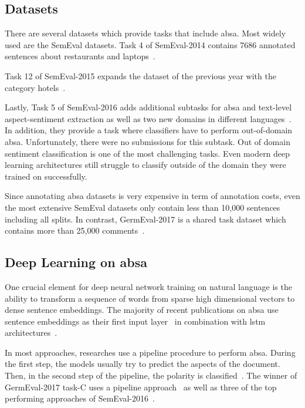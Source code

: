 \subsection{Datasets}

There are several datasets which provide tasks that include \gls{absa}. Most widely used are the SemEval datasets. Task 4 of SemEval-2014 contains 7686 annotated sentences about restaurants and laptops~\cite{Pontiki2014}. 

Task 12 of SemEval-2015 expands the dataset of the previous year with the category hotels~\cite{Pontiki2015a}. 

Lastly, Task 5 of SemEval-2016 adds additional subtasks for \gls{absa} and text-level aspect-sentiment extraction as well as two new domains in different languages~\cite{Pontiki2016}. In addition, they provide a task where classifiers have to perform out-of-domain \gls{absa}. Unfortunately, there were no submissions for this subtask. Out of domain sentiment classification is one of the most challenging tasks. Even modern deep learning architectures still struggle to classify outside of the domain they were trained on successfully.
\medskip

Since annotating \gls{absa} datasets is very expensive in term of annotation costs, even the most extensive SemEval datasets only contain less than 10,000 sentences including all splits. In contrast, GermEval-2017 is a shared task dataset which contains more than 25,000 comments~\cite{Wojatzki2017}.  

\subsection{Deep Learning on \gls{absa}}

One crucial element for deep neural network training on natural language is the ability to transform a sequence of words from sparse high dimensional vectors to dense sentence embeddings. The majority of recent publications on \gls{absa} use sentence embeddings as their first input layer~\cite{Ruder2016, Tang2016, Lee2017, Schmitt2018, Ma2018, Xue2018} in combination with \gls{lstm} architectures~\cite{Ruder2016, Tang2016, Ma2018}.
\medskip

In most approaches, researches use a pipeline procedure to perform \gls{absa}. During the first step, the models usually try to predict the aspects of the document. Then, in the second step of the pipeline, the polarity is classified~\cite{Lakkaraju2014}. The winner of GermEval-2017 task-C uses a pipeline approach~\cite{Lee2017} as well as three of the top performing approaches of SemEval-2016~\cite{Brun2016, Kumar2016, Xenos2016}.
\medskip

